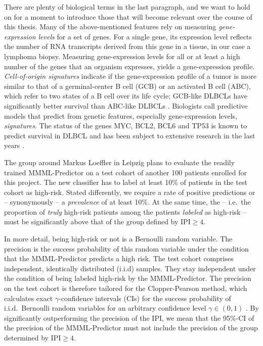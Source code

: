 There are plenty of biological terms in the last paragraph, and we want to hold on for a moment to 
introduce those that will become relevant over the course of this thesis.
Many of the above-mentioned features rely on measuring \textit{gene-expression levels} for a set 
of genes. 
For a single gene, its expression level reflects the number of RNA transcripts derived from 
this gene in a tissue, in our case a lymphoma biopsy. Measuring gene-expression levels for all 
or at least a high number of the genes that an organism expresses, yields a gene-expression 
profile. \textit{Cell-of-origin signatures} indicate if the gene-expression profile 
of a tumor is more similar to that of a germinal-center B cell (GCB) or an activated B cell (ABC), 
which refer to two states of a B cell over its life cycle; GCB-like DLBCLs have 
significantly better survival than ABC-like DLBCLs \cite{abc-gcb00}.
Biologists call predictive models that 
predict from genetic features, especially gene-expression levels, \textit{signatures}. The status 
of the genes MYC, BCL2, BCL6 and TP53 is known to predict survival in DLBCL and has been subject 
to extensive research in the last years
\cite{aukema11, horn13, hummel06, johnson09, klapper08, kretzmer15, rosenwald19, zenz17}.

The group around Markus Loeffler in Leipzig plans to evaluate the readily trained MMML-Predictor on 
a test cohort of another \num{100} patients enrolled for this project. The new classifier has to 
label at least \num{10}\% of 
patients in the test cohort as high-risk. Stated differently, we require a rate of positive 
predictions or -- synonymously -- a \textit{prevalence} of at least \num{10}\%. At the same time, the 
 -- i.e.\ the proportion of \textit{truly} high-risk patients among the patients 
\textit{labeled} as high-risk -- must be significantly above that of the group defined by
$\text{IPI} \geq 4$. 

In more detail, being high-risk or not is a Bernoulli random variable. 
The precision is the success probability of this random variable under the condition that the 
MMML-Predictor predicts a high risk. The test cohort comprises independent, identically distributed 
(i.i.d) samples. They stay independent under the condition of being labeled high-risk by the 
MMML-Predictor. The precision on the test cohort is therefore tailored for the Clopper-Pearson 
method, which calculates exact $\gamma$-confidence intervals (CIs) for the success probability 
of i.i.d.\ Bernoulli random variables for an arbitrary confidence level $\gamma \in (0, 1)$
\cite{clopper34}.
By significantly outperforming the precision of the IPI, we mean that the \num{95}\%-CI
of the precision of the MMML-Predictor must not include the 
precision of the group determined by $\text{IPI} \geq 4$.

